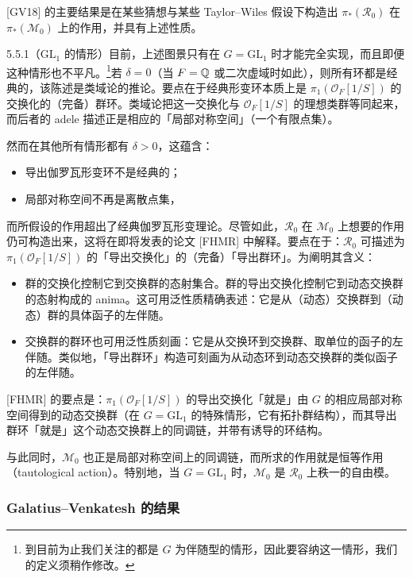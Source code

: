 [GV18] 的主要结果是在某些猜想与某些 Taylor--Wiles 假设下构造出 $\pi_*(\mathcal R_0)$ 在 $\pi_*(\mathcal M_0)$ 上的作用，并具有上述性质。

\begin{exam}{5.5.1}\label{thm:a6-03-11}（$\mathrm{GL}_1$ 的情形）目前，上述图景只有在 $G=\mathrm{GL}_1$ 时才能完全实现，而且即便这种情形也不平凡。\footnote{到目前为止我们关注的都是 $G$ 为伴随型的情形，因此要容纳这一情形，我们的定义须稍作修改。}若 $\delta=0$（当 $F=\mathbb{Q}$ 或二次虚域时如此），则所有环都是经典的，该陈述是类域论的推论。要点在于经典形变环本质上是 $\pi_1(\mathcal O_F[1/S])$ 的交换化的（完备）群环。类域论把这一交换化与 $\mathcal O_F[1/S]$ 的理想类群等同起来，而后者的 adele 描述正是相应的「局部对称空间」（一个有限点集）。

然而在其他所有情形都有 $\delta>0$，这蕴含：
\begin{itemize}[leftmargin=1.4em]
\item 导出伽罗瓦形变环不是经典的；
\item 局部对称空间不再是离散点集，
\end{itemize}
而所假设的作用超出了经典伽罗瓦形变理论。尽管如此，$\mathcal R_0$ 在 $\mathcal M_0$ 上想要的作用仍可构造出来，这将在即将发表的论文 [FHMR] 中解释。要点在于：$\mathcal R_0$ 可描述为 $\pi_1(\mathcal O_F[1/S])$ 的「导出交换化」的（完备）「导出群环」。为阐明其含义：
\begin{itemize}[leftmargin=1.4em]
\item 群的交换化控制它到交换群的态射集合。群的导出交换化控制它到动态交换群的态射构成的 anima。这可用泛性质精确表述：它是从（动态）交换群到（动态）群的具体函子的左伴随。
\item 交换群的群环也可用泛性质刻画：它是从交换环到交换群、取单位的函子的左伴随。类似地，「导出群环」构造可刻画为从动态环到动态交换群的类似函子的左伴随。
\end{itemize}
[FHMR] 的要点是：$\pi_1(\mathcal O_F[1/S])$ 的导出交换化「就是」由 $G$ 的相应局部对称空间得到的动态交换群（在 $G=\mathrm{GL}_1$ 的特殊情形，它有拓扑群结构），而其导出群环「就是」这个动态交换群上的同调链，并带有诱导的环结构。

与此同时，$\mathcal M_0$ 也正是局部对称空间上的同调链，而所求的作用就是恒等作用（tautological action）。特别地，当 $G=\mathrm{GL}_1$ 时，$\mathcal M_0$ 是 $\mathcal R_0$ 上秩一的自由模。
\end{exam}

\subsubsection{Galatius--Venkatesh 的结果}

